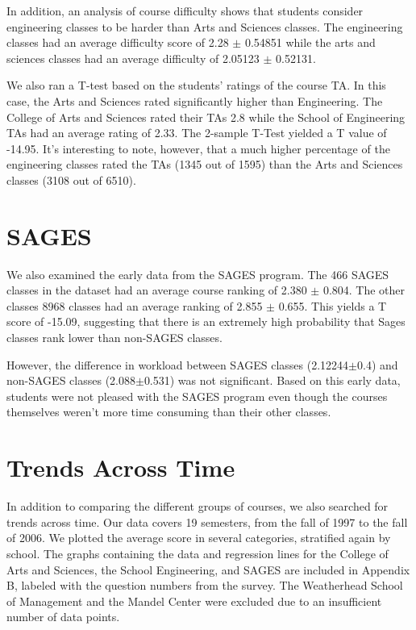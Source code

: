 \documentclass[12pt]{article}
\begin{document}
In addition, an analysis of course difficulty shows that students consider engineering classes to be harder than Arts and Sciences classes. The engineering classes had an average difficulty score of 2.28 $\pm$ 0.54851 while the arts and sciences classes had an average difficulty of 2.05123 $\pm$ 0.52131.

We also ran a T-test based on the students' ratings of the course TA. In this case, the Arts and Sciences rated significantly higher than Engineering. The College of Arts and Sciences rated their TAs 2.8 while the School of Engineering TAs had an average rating of 2.33. The 2-sample T-Test yielded a T value of -14.95. It's interesting to note, however, that a much higher percentage of the engineering classes rated the TAs (1345 out of 1595) than the Arts and Sciences classes (3108 out of 6510).

\section{SAGES}
We also examined the early data from the SAGES program. The 466 SAGES classes in the dataset had an average course ranking of 2.380 $\pm$ 0.804. The other classes 8968 classes had an average ranking of 2.855 $\pm$ 0.655. This yields a T score of -15.09, suggesting that there is an extremely high probability that Sages classes rank lower than non-SAGES classes.

However, the difference in workload between SAGES classes (2.12244$\pm$0.4) and non-SAGES classes (2.088$\pm$0.531) was not significant. Based on this early data, students were not pleased with the SAGES program even though the courses themselves weren't more time consuming than their other classes.

\section{Trends Across Time}
In addition to comparing the different groups of courses, we also searched for trends across time. Our data covers 19 semesters, from the fall of 1997 to the fall of 2006. We plotted the average score in several categories, stratified again by school. The graphs containing the data and regression lines for the College of Arts and Sciences, the School Engineering, and SAGES are included in Appendix B, labeled with the question numbers from the survey. The Weatherhead School of Management and the Mandel Center were excluded due to an insufficient number of data points.
\end{document}
